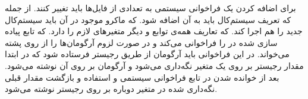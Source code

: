برای اضافه کردن یک فراخوانی سیستمی به 
 تعدادی از فایل‌ها باید تغییر کنند. از جمله 
که تعریف سیستم‌کال باید به آن اضافه شود. 
که ماکرو موجود در آن باید سیستم‌کال جدید را هم اجرا کند. 
 که تعاریف همه‌ی توابع و دیگر متغیرهای لازم را دارد. 
که تابع پیاده سازی شده در 
 را فراخوانی می‌کند و در صورت لزوم آرگومان‌ها را از روی پشته می‌خواند. در این فراخوانی باید آرگومان از طریق رجیستر فرستاده شود که در ابتدا مقدار رجیستر 
 بر روی یک متغیر نگه‌داری می‌شود و آرگومان بر روی آن نوشته می‌شود. بعد از خوانده شدن در تابع فراخوانی سیستمی و استفاده و بازگشت مقدار قبلی نگه‌داری شده در متغیر دوباره بر روی رجیستر 
  نوشته می‌شود.